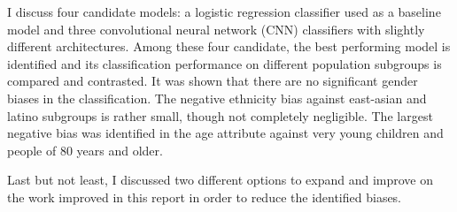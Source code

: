 \documentclass{article}
\begin{document}
I discuss four candidate models: a logistic regression classifier used as a baseline model and three convolutional neural network (CNN) classifiers with slightly different architectures. Among these four candidate, the best performing model is identified and its classification performance on different population subgroups is compared and contrasted. It was shown that there are no significant gender biases in the classification. The negative ethnicity bias against east-asian and latino subgroups is rather small, though not completely negligible. The largest negative bias was identified in the age attribute against very young children and people of 80 years and older.

Last but not least, I discussed two different options to expand and improve on the work improved in this report in order to reduce the identified biases.



\end{document}
